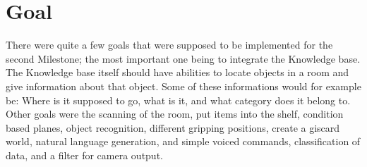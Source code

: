 \documentclass[main.tex]{subfiles}
\begin{document}
	
    \chapter{Goal}
		
    There were quite a few goals that were supposed to be implemented for the second Milestone; the most important one being to integrate the Knowledge base. The Knowledge base itself should have abilities to locate objects in a room and give information about that object. Some of these informations would for example be: Where is it supposed to go, what is it, and what category does it belong to.
    Other goals were the scanning of the room, put items into the shelf, condition based planes, object recognition, different gripping positions, create a giscard world, natural language generation, and simple voiced commands, classification of data, and a filter for camera output. 
    
\end{document}

